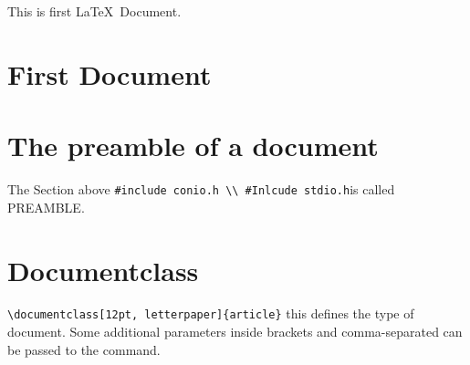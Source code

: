 \documentclass{article}
\begin{document}
This is first \LaTeX\ Document. 

\section{First Document}


\section{The preamble of a document} 
The Section above 
\verb|#include conio.h \\ #Inlcude stdio.h|is called PREAMBLE.

\section{Documentclass}
\verb|\documentclass[12pt, letterpaper]{article}|
this defines the type of document. Some additional parameters inside brackets and comma-separated can be passed to the command.
\end{document}
